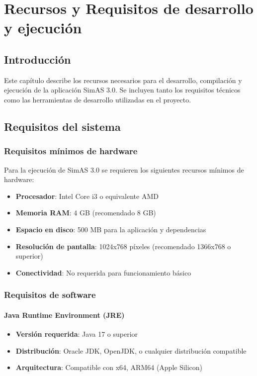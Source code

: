 \chapter{Recursos y Requisitos de desarrollo y ejecución}\label{cap-requisitos-desarrollo-ejecucion}

\section{Introducción}

Este capítulo describe los recursos necesarios para el desarrollo, compilación y ejecución de la aplicación SimAS 3.0. Se incluyen tanto los requisitos técnicos como las herramientas de desarrollo utilizadas en el proyecto.

\section{Requisitos del sistema}

\subsection{Requisitos mínimos de hardware}

Para la ejecución de SimAS 3.0 se requieren los siguientes recursos mínimos de hardware:

\begin{itemize}
    \item \textbf{Procesador}: Intel Core i3 o equivalente AMD
    \item \textbf{Memoria RAM}: 4 GB (recomendado 8 GB)
    \item \textbf{Espacio en disco}: 500 MB para la aplicación y dependencias
    \item \textbf{Resolución de pantalla}: 1024x768 píxeles (recomendado 1366x768 o superior)
    \item \textbf{Conectividad}: No requerida para funcionamiento básico
\end{itemize}

\subsection{Requisitos de software}

\subsubsection{Java Runtime Environment (JRE)}
\begin{itemize}
    \item \textbf{Versión requerida}: Java 17 o superior
    \item \textbf{Distribución}: Oracle JDK, OpenJDK, o cualquier distribución compatible
    \item \textbf{Arquitectura}: Compatible con x64, ARM64 (Apple Silicon)
\end{itemize}


